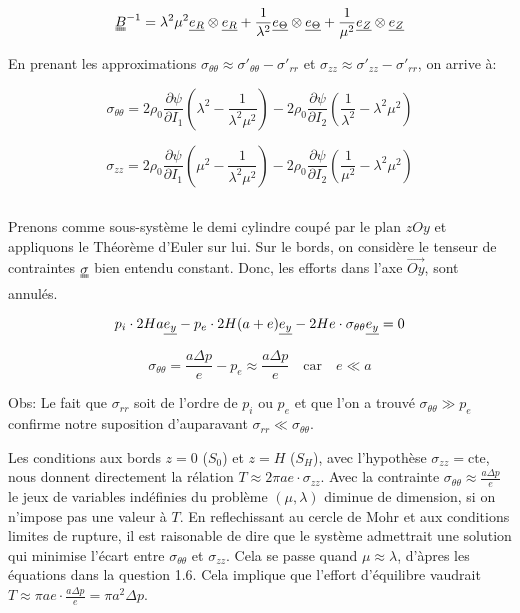 \documentclass[a4paper,11pt]{article}
\newcommand{\tens}{\uuline}
\newcommand{\verseur}[1]{\uline{e_{#1}}}
\newcommand{\diage}[1]{\uline{e_{#1}} \otimes \uline{e_{#1}}}
\begin{document}
$$ \tens{B}^{-1} = \lambda^2\mu^2 \diage{R} + \frac{1}{\lambda^2} \diage{\Theta} + \frac{1}{\mu^2} \diage{Z} $$

En prenant les approximations $\sigma_{\theta\theta} \approx \sigma'_{\theta\theta} - \sigma'_{rr}$ et $\sigma_{zz} \approx \sigma'_{zz} - \sigma'_{rr}$, on arrive à:

$$\sigma_{\theta\theta} = 2 \rho_0 \frac{\partial\psi}{\partial I_1} \left( \lambda^2 - \frac{1}{\lambda^2\mu^2} \right) - 2 \rho_0 \frac{\partial\psi}{\partial I_2} \left( \frac{1}{\lambda^2} - \lambda^2\mu^2 \right)$$

$$\sigma_{zz} = 2 \rho_0 \frac{\partial\psi}{\partial I_1} \left( \mu^2 - \frac{1}{\lambda^2\mu^2} \right) - 2 \rho_0 \frac{\partial\psi}{\partial I_2} \left( \frac{1}{\mu^2} - \lambda^2\mu^2 \right)$$

\subsection{}

Prenons comme sous-système le demi cylindre coupé par le plan $zOy$ et appliquons le Théorème d'Euler sur lui. Sur le bords, on considère le tenseur de contraintes $\tens{\sigma}$ bien entendu constant. Donc, les efforts dans l'axe $\vec{Oy}$, sont annulés.

$$p_i \cdot 2Ha \verseur{y} - p_e \cdot 2H (a+e) \verseur{y} - 2He \cdot \sigma_{\theta\theta} \verseur{y} = 0$$

$$\sigma_{\theta\theta} = \frac{a\Delta p}{e} - p_e \approx  \frac{a\Delta p}{e} \quad\mathrm{car }\quad e \ll a$$

Obs: Le fait que $\sigma_{rr}$ soit de l'ordre de $p_i$ ou $p_e$ et que l'on a trouvé $\sigma_{\theta\theta} \gg p_e$ confirme notre suposition d'auparavant $\sigma_{rr} \ll \sigma_{\theta\theta}$.

Les conditions aux bords $z=0$ ($S_0$) et $z=H$ ($S_H$), avec l'hypothèse $\sigma_{zz} = \mathrm{cte}$, nous donnent directement la rélation $T \approx 2\pi a e \cdot \sigma_{zz}$. Avec la contrainte $\sigma_{\theta\theta} \approx \frac{a\Delta p}{e}$ le jeux de variables indéfinies du problème $(\mu, \lambda)$ diminue de dimension, si on n'impose pas une valeur à $T$. En reflechissant au cercle de Mohr et aux conditions limites de rupture, il est raisonable de dire que le système admettrait une solution qui minimise l'écart entre $\sigma_{\theta\theta}$ et $\sigma_{zz}$. Cela se passe quand $\mu \approx \lambda$, d'àpres les équations dans la question 1.6. Cela implique que l'effort d'équilibre vaudrait $T \approx \pi ae \cdot \frac{a\Delta p}{e} = \pi a^2 \Delta p$.
\end{document}
